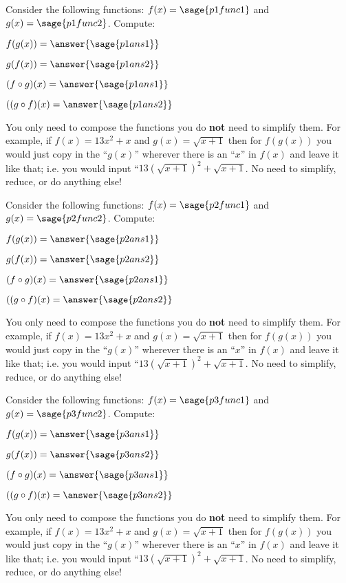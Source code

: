 \documentclass{ximera}
\begin{document}
\begin{problem}
Consider the following functions: $f(x) = \sage{p1func1}$ and $g(x) = \sage{p1func2}$. Compute:

$f(g(x)) = \answer{\sage{p1ans1}}$

$g(f(x)) = \answer{\sage{p1ans2}}$

$(f\circ g)(x) = \answer{\sage{p1ans1}}$

$((g\circ f)(x) = \answer{\sage{p1ans2}}$

\begin{feedback}
    You only need to compose the functions you do \textbf{not} need to simplify them. For example, if $f(x) = 13x^2 + x$ and $g(x) = \sqrt{x+1}$ then for $f(g(x))$ you would just copy in the ``$g(x)$'' wherever there is an ``$x$'' in $f(x)$ and leave it like that; i.e. you would input ``$13(\sqrt{x+1})^2 + \sqrt{x+1}$. No need to simplify, reduce, or do anything else!
\end{feedback}

\end{problem}


\begin{problem}
Consider the following functions: $f(x) = \sage{p2func1}$ and $g(x) = \sage{p2func2}$. Compute:

$f(g(x)) = \answer{\sage{p2ans1}}$

$g(f(x)) = \answer{\sage{p2ans2}}$

$(f\circ g)(x) = \answer{\sage{p2ans1}}$

$((g\circ f)(x) = \answer{\sage{p2ans2}}$

\begin{feedback}
    You only need to compose the functions you do \textbf{not} need to simplify them. For example, if $f(x) = 13x^2 + x$ and $g(x) = \sqrt{x+1}$ then for $f(g(x))$ you would just copy in the ``$g(x)$'' wherever there is an ``$x$'' in $f(x)$ and leave it like that; i.e. you would input ``$13(\sqrt{x+1})^2 + \sqrt{x+1}$. No need to simplify, reduce, or do anything else!
\end{feedback}
\end{problem}


\begin{problem}
Consider the following functions: $f(x) = \sage{p3func1}$ and $g(x) = \sage{p3func2}$. Compute:

$f(g(x)) = \answer{\sage{p3ans1}}$

$g(f(x)) = \answer{\sage{p3ans2}}$

$(f\circ g)(x) = \answer{\sage{p3ans1}}$

$((g\circ f)(x) = \answer{\sage{p3ans2}}$

\begin{feedback}
    You only need to compose the functions you do \textbf{not} need to simplify them. For example, if $f(x) = 13x^2 + x$ and $g(x) = \sqrt{x+1}$ then for $f(g(x))$ you would just copy in the ``$g(x)$'' wherever there is an ``$x$'' in $f(x)$ and leave it like that; i.e. you would input ``$13(\sqrt{x+1})^2 + \sqrt{x+1}$. No need to simplify, reduce, or do anything else!
\end{feedback}
\end{problem}
\end{document}

